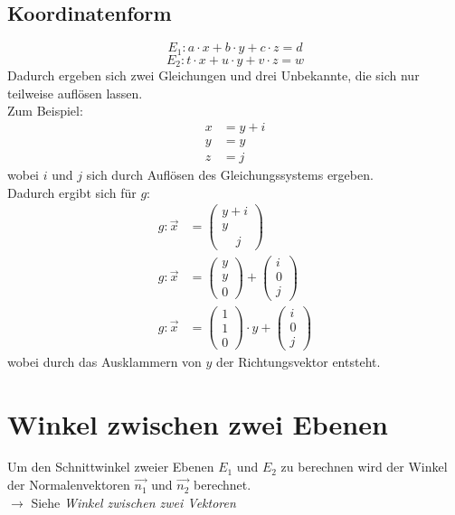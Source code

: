 \documentclass[a4paper,12pt]{article}
\begin{document}
\subsection{Koordinatenform}
$$E_1 : a \cdot x + b \cdot y + c \cdot z = d$$
$$E_2 : t \cdot x + u \cdot y + v \cdot z = w$$
Dadurch ergeben sich zwei Gleichungen und drei Unbekannte, die sich nur teilweise auflösen lassen.\\
Zum Beispiel:
\begin{equation*}
\begin{split}
x & = y + i\\
y & = y\\
z & = j
\end{split}
\end{equation*}
wobei $i$ und $j$ sich durch Auflösen des Gleichungssystems ergeben.\\
Dadurch ergibt sich für $g$:
\begin{equation*}
\begin{split}
g : \vec{x} & = \begin{pmatrix}y + i\\y\ \ \ \ \ \\\ \ \ \ \ j\end{pmatrix}\\
g : \vec{x} & = \begin{pmatrix}y\\y\\0\end{pmatrix} + \begin{pmatrix}i\\0\\j\end{pmatrix}\\
g : \vec{x} & = \begin{pmatrix}1\\1\\0\end{pmatrix} \cdot y + \begin{pmatrix}i\\0\\j\end{pmatrix}
\end{split}
\end{equation*}
wobei durch das Ausklammern von $y$ der Richtungsvektor entsteht.
\pagebreak
\section{Winkel zwischen zwei Ebenen}
Um den Schnittwinkel zweier Ebenen $E_1$ und $E_2$ zu berechnen wird der Winkel der Normalenvektoren $\vec{n_1}$ und $\vec{n_2}$ berechnet.\\
$\rightarrow$ Siehe \textit{Winkel zwischen zwei Vektoren}
\end{document}
